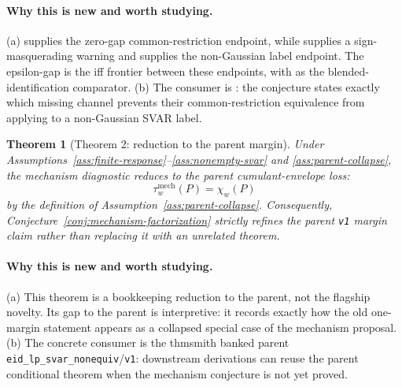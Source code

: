 \documentclass[11pt]{article}
\theoremstyle{definition}
\theoremstyle{plain}
\newtheorem{theorem}{Theorem}
\theoremstyle{remark}
\begin{document}
\paragraph{Why this is new and worth studying.}
(a) \citet[Sections~2--3]{PlagborgMollerWolf2021} supplies the zero-gap common-restriction endpoint, while \citet[Section~2]{Wolf2022} supplies a sign-masquerading warning and \citet[Sections~2--3]{GourierouxMonfortRenne2017} supplies the non-Gaussian label endpoint.  The epsilon-gap is the iff frontier between these endpoints, with \citet[Sections~2--3]{CarrieroMarcellinoTornese2024} as the blended-identification comparator.  (b) The consumer is \citet{PlagborgMollerWolf2021}: the conjecture states exactly which missing channel prevents their common-restriction equivalence from applying to a non-Gaussian SVAR label.

\begin{theorem}[Theorem 2: reduction to the parent margin]\label{thm:parent-reduction}
Under Assumptions~\ref{ass:finite-response}--\ref{ass:nonempty-svar} and \ref{ass:parent-collapse}, the mechanism diagnostic reduces to the parent cumulant-envelope loss:
\[
\tau_w^{\mathrm{mech}}(P)=\chi_w(P)
\]
by the definition of Assumption~\ref{ass:parent-collapse}.  Consequently, Conjecture~\ref{conj:mechanism-factorization} strictly refines the parent \texttt{v1} margin claim rather than replacing it with an unrelated theorem.
\end{theorem}
\paragraph{Why this is new and worth studying.}
(a) This theorem is a bookkeeping reduction to the parent, not the flagship novelty.  Its gap to the parent is interpretive: it records exactly how the old one-margin statement appears as a collapsed special case of the mechanism proposal.  (b) The concrete consumer is the thmsmith banked parent \texttt{eid\_lp\_svar\_nonequiv}/\texttt{v1}: downstream derivations can reuse the parent conditional theorem when the mechanism conjecture is not yet proved.
\end{document}
